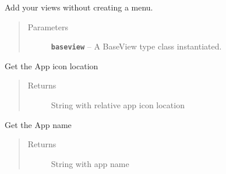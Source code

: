 \documentclass[letterpaper,10pt,english]{sphinxmanual}
\begin{document}
\begin{fulllineitems}
\begin{fulllineitems}
\end{fulllineitems}


\begin{fulllineitems}
\label{api:flask.ext.appbuilder.base.AppBuilder.add_view_no_menu}
Add your views without creating a menu.
\begin{quote}\begin{description}
\item[{Parameters}] \leavevmode
\textbf{\texttt{baseview}} -- A BaseView type class instantiated.

\end{description}\end{quote}

\end{fulllineitems}


\begin{fulllineitems}
\label{api:flask.ext.appbuilder.base.AppBuilder.app_icon}
Get the App icon location
\begin{quote}\begin{description}
\item[{Returns}] \leavevmode
String with relative app icon location

\end{description}\end{quote}

\end{fulllineitems}


\begin{fulllineitems}
\label{api:flask.ext.appbuilder.base.AppBuilder.app_name}
Get the App name
\begin{quote}\begin{description}
\item[{Returns}] \leavevmode
String with app name

\end{description}\end{quote}

\end{fulllineitems}


\end{fulllineitems}
\end{document}
